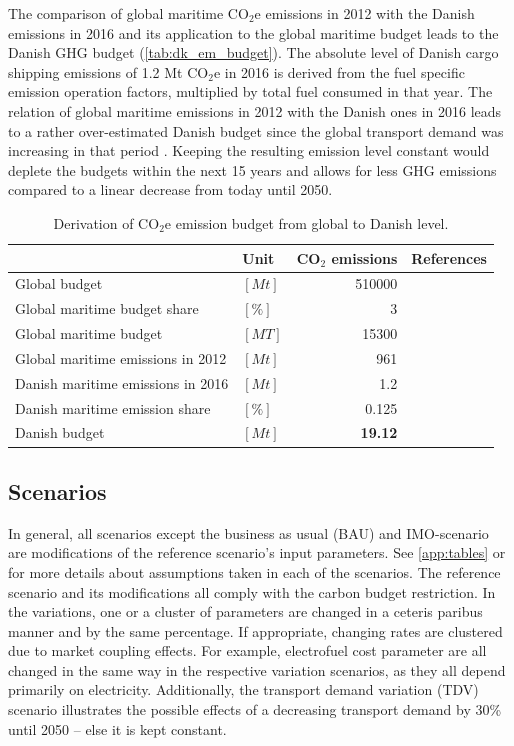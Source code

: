 \documentclass[article]{elsarticle}
\begin{document}
The comparison of global maritime CO$_2$e emissions in 2012 with the Danish emissions in 2016 and its application to the global maritime budget leads to the Danish GHG budget (\autoref{tab:dk_em_budget}). The absolute level of Danish cargo shipping emissions of 1.2 Mt CO$_2$e in 2016 is derived from the fuel specific emission operation factors, multiplied by total fuel consumed in that year. The relation of global maritime emissions in 2012 with the Danish ones in 2016 leads to a rather over-estimated Danish budget since the global transport demand was increasing in that period \cite[Tab.~3,~p.~5]{UNCTAD2017}. Keeping the resulting emission level constant would deplete the budgets within the next 15 years and allows for less GHG emissions compared to a linear decrease from today until 2050.
\begin{table}[htb]
    \centering
    \begin{tabular}{llrr}
        \toprule
         & Unit & CO$_2$ emissions & References \\
         \midrule
         Global budget & $\left[Mt\right]$ & 510000 & \cite{IPCC2013} \\
         Global maritime budget share & $\left[\%\right]$ & 3 & \cite{Olmer2017} \\
         Global maritime budget & $\left[MT\right]$ & 15300 &\\[1.5ex]
         Global maritime emissions in 2012 & $\left[Mt\right]$ & 961 & \cite{Smith2014} \\
         Danish maritime emissions in 2016 & $\left[Mt\right]$ & 1.2 & \cite{Kristensen2012,Eurostat2018,Wisdom2017} \\
         Danish maritime emission share & $\left[\%\right]$ & 0.125 &\\[1.5ex]
         Danish budget & $\left[Mt\right]$ & \textbf{19.12} & \\
         \bottomrule
    \end{tabular}
    \caption{Derivation of CO$_2$e emission budget from global to Danish level.}
    \label{tab:dk_em_budget}
\end{table}


\subsection{Scenarios}
\label{subsec:Sce}
In general, all scenarios except the business as usual (BAU) and IMO-scenario are modifications of the reference scenario's input parameters. See \ref{app:tables} or \cite{Thesis2018} for more details about assumptions taken in each of the scenarios. The reference scenario and its modifications all comply with the carbon budget restriction. In the variations, one or a cluster of parameters are changed in a ceteris paribus manner and by the same percentage. If appropriate, changing rates are clustered due to market coupling effects. For example, electrofuel cost parameter are all changed in the same way in the respective variation scenarios, as they all depend primarily on electricity. Additionally, the transport demand variation (TDV) scenario illustrates the possible effects of a decreasing transport demand by 30\% until 2050 -- else it is kept constant.
\end{document}
